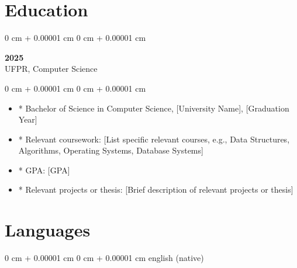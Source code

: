 \documentclass[10pt, letterpaper]{article}
\newenvironment{highlights}{
    \begin{itemize}[
        topsep=0.10 cm,
        parsep=0.10 cm,
        partopsep=0pt,
        itemsep=0pt,
        leftmargin=0 cm + 10pt
    ]
}{
    \end{itemize}
}
\newenvironment{onecolentry}{
    \begin{adjustwidth}{
        0 cm + 0.00001 cm
    }{
        0 cm + 0.00001 cm
    }
}{
    \end{adjustwidth}
}
\begin{document}
\section{Education}

\begin{onecolentry}
    \setcolumnwidth{\fill, 4.5cm}
    \begin{paracol}{2}
        \textbf{2025} \\ UFPR, Computer Science
        \switchcolumn
    \end{paracol}
\end{onecolentry}
\vspace{0.10cm}
\begin{onecolentry}
    \begin{highlights}
                \item * Bachelor of Science in Computer Science, [University Name], [Graduation Year]
                \item * Relevant coursework: [List specific relevant courses, e.g., Data Structures, Algorithms, Operating Systems, Database Systems]
                \item * GPA: [GPA]
                \item * Relevant projects or thesis: [Brief description of relevant projects or thesis]
    \end{highlights}
\end{onecolentry}

\section{Languages}
\begin{onecolentry}{english (native)}\end{onecolentry}
\end{document}
